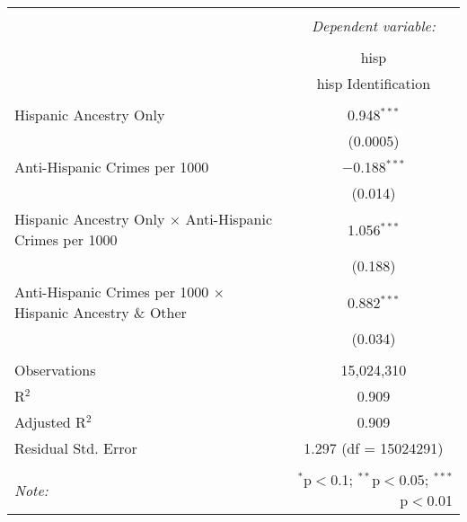 \documentclass{article}
\begin{document}
    \begin{table}[!htbp] \centering 
      \caption{} 
      \label{} 
    \begin{tabular}{@{\extracolsep{5pt}}lc} 
    \\[-1.8ex]\hline 
    \hline \\[-1.8ex] 
     & \multicolumn{1}{c}{\textit{Dependent variable:}} \\ 
    \cline{2-2} 
    \\[-1.8ex] & hisp \\ 
     & hisp Identification \\ 
    \hline \\[-1.8ex] 
     Hispanic Ancestry Only & 0.948$^{***}$ \\ 
      & (0.0005) \\ 
     Anti-Hispanic Crimes per 1000 & $-$0.188$^{***}$ \\ 
      & (0.014) \\ 
     Hispanic Ancestry Only $\times$ Anti-Hispanic Crimes per 1000 & 1.056$^{***}$ \\ 
      & (0.188) \\ 
     Anti-Hispanic Crimes per 1000 $\times$ Hispanic Ancestry \& Other & 0.882$^{***}$ \\ 
      & (0.034) \\ 
    \hline \\[-1.8ex] 
    Observations & 15,024,310 \\ 
    R$^{2}$ & 0.909 \\ 
    Adjusted R$^{2}$ & 0.909 \\ 
    Residual Std. Error & 1.297 (df = 15024291) \\ 
    \hline 
    \hline \\[-1.8ex] 
    \textit{Note:}  & \multicolumn{1}{r}{$^{*}$p$<$0.1; $^{**}$p$<$0.05; $^{***}$p$<$0.01} \\ 
    \end{tabular} 
    \end{table}     
    
\newpage    
\end{document}
